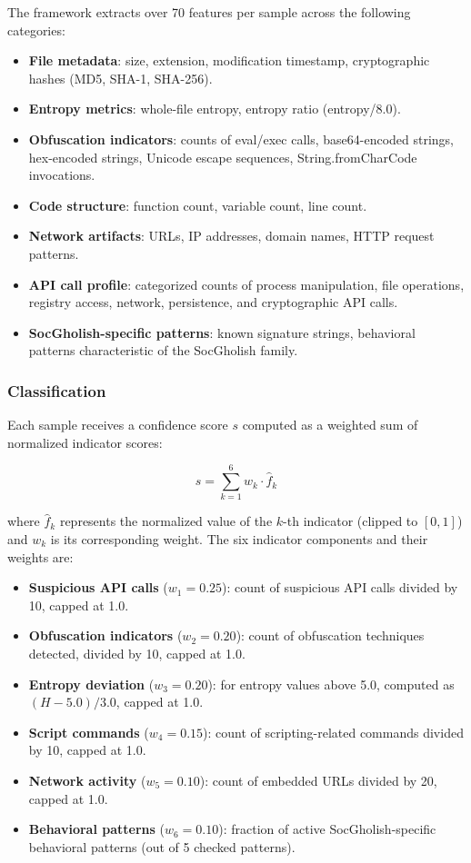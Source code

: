 \documentclass[pdflatex,sn-mathphys-num]{sn-jnl}
\theoremstyle{thmstyleone}%
\theoremstyle{thmstyletwo}%
\theoremstyle{thmstylethree}%
\begin{document}
The framework extracts over 70 features per sample across the following categories:

\begin{itemize}
    \item \textbf{File metadata}: size, extension, modification timestamp, cryptographic hashes (MD5, SHA-1, SHA-256).
    \item \textbf{Entropy metrics}: whole-file entropy, entropy ratio (entropy/8.0).
    \item \textbf{Obfuscation indicators}: counts of eval/exec calls, base64-encoded strings, hex-encoded strings, Unicode escape sequences, String.fromCharCode invocations.
    \item \textbf{Code structure}: function count, variable count, line count.
    \item \textbf{Network artifacts}: URLs, IP addresses, domain names, HTTP request patterns.
    \item \textbf{API call profile}: categorized counts of process manipulation, file operations, registry access, network, persistence, and cryptographic API calls.
    \item \textbf{SocGholish-specific patterns}: known signature strings, behavioral patterns characteristic of the SocGholish family.
\end{itemize}

\subsubsection{Classification}\label{subsubsec:classification}

Each sample receives a confidence score $s$ computed as a weighted sum of normalized indicator scores:

\begin{equation}
s = \sum_{k=1}^{6} w_k \cdot \hat{f}_k
\label{eq:confidence}
\end{equation}

\noindent where $\hat{f}_k$ represents the normalized value of the $k$-th indicator (clipped to $[0,1]$) and $w_k$ is its corresponding weight. The six indicator components and their weights are:

\begin{itemize}
    \item \textbf{Suspicious API calls} ($w_1 = 0.25$): count of suspicious API calls divided by 10, capped at 1.0.
    \item \textbf{Obfuscation indicators} ($w_2 = 0.20$): count of obfuscation techniques detected, divided by 10, capped at 1.0.
    \item \textbf{Entropy deviation} ($w_3 = 0.20$): for entropy values above 5.0, computed as $(H - 5.0)/3.0$, capped at 1.0.
    \item \textbf{Script commands} ($w_4 = 0.15$): count of scripting-related commands divided by 10, capped at 1.0.
    \item \textbf{Network activity} ($w_5 = 0.10$): count of embedded URLs divided by 20, capped at 1.0.
    \item \textbf{Behavioral patterns} ($w_6 = 0.10$): fraction of active SocGholish-specific behavioral patterns (out of 5 checked patterns).
\end{itemize}
\end{document}
